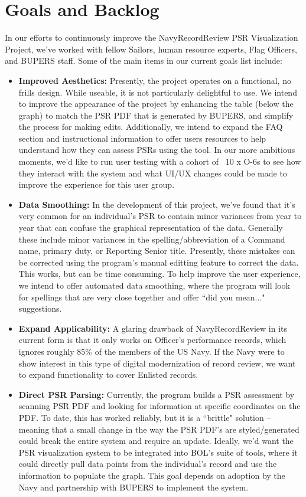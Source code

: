 \documentclass[UTF8]{article}
\begin{document}
\section{Goals and Backlog}
In our efforts to continuously improve the NavyRecordReview PSR Visualization 
Project, we've worked with fellow Sailors, human resource experts, 
Flag Officers, and BUPERS staff. Some of the main items in our current goals 
list include:
\begin{itemize}
  \item \textbf{Improved Aesthetics:} Presently, the project operates on a 
  functional, no frills design. While useable, it is not particularly 
  delightful to use. We intend to improve the appearance of the project by 
  enhancing the table (below the graph) to match the PSR PDF that is generated
  by BUPERS, and simplify the process for making edits. Additionally, we intend
  to expand the FAQ section and instructional information to offer users
  resources to help understand how they can assess PSRs using the tool. In our
  more ambitious moments, we'd like to run user testing with a cohort of ~10 x 
  O-6s to see how they interact with the system and what UI/UX changes could be
  made to improve the experience for this user group.

  \item \textbf{Data Smoothing:} In the development of this project, we've found
  that it's very common for an individual's PSR to contain minor variances from
  year to year that can confuse the graphical representation of the data.
  Generally these include minor variances in the spelling/abbreviation of a 
  Command name, primary duty, or Reporting Senior title. Presently, these 
  mistakes can be corrected using the program's manual editting feature to
  correct the data. This works, but can be time consuming. To help improve the 
  user experience, we intend to offer automated data smoothing, where the 
  program will look for spellings that are very close together and offer 
  ``did you mean..." suggestions.

  \item \textbf{Expand Applicability:} A glaring drawback of NavyRecordReview in
  its current form is that it only works on Officer's performance records, which
  ignores roughly 85\% of the members of the US Navy. If the Navy were to show 
  interest in this type of digital modernization of record review, we want to 
  expand functionality to cover Enlisted records.

  \item \textbf{Direct PSR Parsing:} Currently, the program builds a PSR 
  assessment by scanning PSR PDF and looking for information at specific 
  coordinates on the PDF. To date, this has worked reliably, but it is a 
  ``brittle" solution -- meaning that a small change in the way the PSR PDF's are
  styled/generated could break the entire system and require an update.
  Ideally, we'd want the PSR visualization system to be integrated into BOL's 
  suite of tools, where it could directly pull data points from the 
  individual's record and use the information to populate the graph. This goal 
  depends on adoption by the Navy and partnership with BUPERS to implement the
  system.

\end{itemize}
\end{document}
